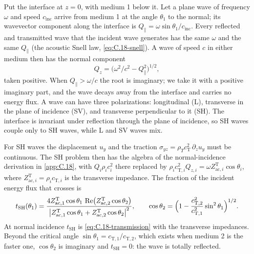 Put the interface at $z = 0$, with medium 1 below it. Let a plane wave of frequency $\omega$ and speed $c_{\mathrm{inc}}$ arrive from medium 1 at the angle $\theta_1$ to the normal; its wavevector component along the interface is $Q_\parallel = \omega\sin\theta_1/c_{\mathrm{inc}}$. Every reflected and transmitted wave that the incident wave generates has the same $\omega$ and the same $Q_\parallel$ (the acoustic Snell law, \cref{eq:C.18-snell}). A wave of speed $c$ in either medium then has the normal component
\begin{equation}
  Q_z = \bigl(\omega^2/c^2 - Q_\parallel^2\bigr)^{1/2} ,
  \label{eq:20.3-Qz}
\end{equation}
taken positive. When $Q_\parallel > \omega/c$ the root is imaginary; we take it with a positive imaginary part, and the wave decays away from the interface and carries no energy flux. A wave can have three polarizations: longitudinal (L), transverse in the plane of incidence (SV), and transverse perpendicular to it (SH). The interface is invariant under reflection through the plane of incidence, so SH waves couple only to SH waves, while L and SV waves mix.

For SH waves the displacement $u_y$ and the traction $\sigma_{yz} = \rho_Tc_{\mathrm{T}}^2\,\partial_zu_y$ must be continuous. The SH problem then has the algebra of the normal-incidence derivation in \cref{app:C.18}, with $Q_i\rho_ic_i^2$ there replaced by $\rho_ic_{\mathrm{T},i}^2Q_{z,i} = \omega Z^{\mathrm{T}}_{\mathrm{ac},i}\cos\theta_i$, where $Z^{\mathrm{T}}_{\mathrm{ac},i} = \rho_ic_{\mathrm{T},i}$ is the transverse impedance. The fraction of the incident energy flux that crosses is
\begin{equation}
  t_{\mathrm{SH}}(\theta_1) = \frac{4Z^{\mathrm{T}}_{\mathrm{ac},1}\cos\theta_1\,\operatorname{Re}\bigl(Z^{\mathrm{T}}_{\mathrm{ac},2}\cos\theta_2\bigr)}{\bigl|Z^{\mathrm{T}}_{\mathrm{ac},1}\cos\theta_1 + Z^{\mathrm{T}}_{\mathrm{ac},2}\cos\theta_2\bigr|^2} ,
  \qquad
  \cos\theta_2 = \Bigl(1 - \frac{c_{\mathrm{T},2}^2}{c_{\mathrm{T},1}^2}\sin^2\theta_1\Bigr)^{1/2} .
  \label{eq:20.3-SH}
\end{equation}
At normal incidence $t_{\mathrm{SH}}$ is \cref{eq:C.18-transmission} with the transverse impedances. Beyond the critical angle $\sin\theta_1 = c_{\mathrm{T},1}/c_{\mathrm{T},2}$, which exists when medium 2 is the faster one, $\cos\theta_2$ is imaginary and $t_{\mathrm{SH}} = 0$: the wave is totally reflected.

